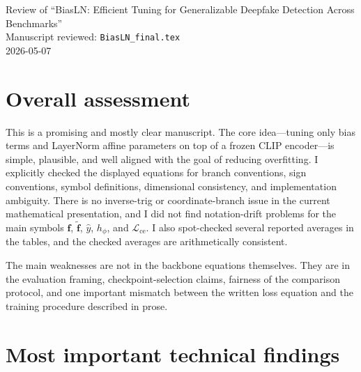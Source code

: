 \documentclass[11pt]{article}
\begin{document}
\begin{center}
{\LARGE Review of ``BiasLN: Efficient Tuning for Generalizable Deepfake Detection Across Benchmarks''}\\[0.5em]
{\large Manuscript reviewed: \texttt{BiasLN\_final.tex}}\\[0.25em]
2026-05-07
\end{center}

\section*{Overall assessment}
This is a promising and mostly clear manuscript. The core idea---tuning only bias terms and LayerNorm affine parameters on top of a frozen CLIP encoder---is simple, plausible, and well aligned with the goal of reducing overfitting. I explicitly checked the displayed equations for branch conventions, sign conventions, symbol definitions, dimensional consistency, and implementation ambiguity. There is no inverse-trig or coordinate-branch issue in the current mathematical presentation, and I did not find notation-drift problems for the main symbols $\mathbf{f}$, $\tilde{\mathbf{f}}$, $\hat{y}$, $h_{\phi}$, and $\mathcal{L}_{\text{ce}}$. I also spot-checked several reported averages in the tables, and the checked averages are arithmetically consistent.

The main weaknesses are not in the backbone equations themselves. They are in the evaluation framing, checkpoint-selection claims, fairness of the comparison protocol, and one important mismatch between the written loss equation and the training procedure described in prose.

\section*{Most important technical findings}
\end{document}
